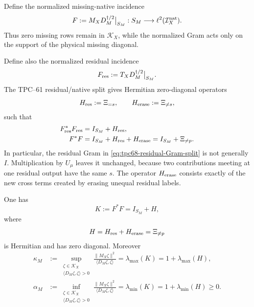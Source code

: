 Define the normalized missing-native incidence
\begin{equation}
 F:=M_XD_M^{\dagger/2}\big|_{S_M}:
 S_M\longrightarrow
 \ell^2(\mathcal I_X^{\rm nat}).
 \label{eq:tpc68-normalized-F}
\end{equation}
Thus zero missing rows remain in \(\mathcal K_X\), while the normalized
Gram acts only on the support of the physical missing diagonal.

Define also the normalized residual incidence
\begin{equation}
 F_{\rm res}:=T_XD_M^{\dagger/2}\big|_{S_M}.
 \label{eq:tpc68-normalized-residual}
\end{equation}
The TPC--61 residual/native split gives Hermitian zero-diagonal operators
\begin{equation}
 H_{\rm res}:=\Xi_{=s},
 \qquad
 H_{\rm erase}:=\Xi_{\ne s},
 \label{eq:tpc68-res-erase-defects}
\end{equation}
such that
\begin{align}
 F_{\rm res}^*F_{\rm res}
 &=I_{S_M}+H_{\rm res},
 \label{eq:tpc68-residual-Gram-split}\\
 F^*F
 &=I_{S_M}+H_{\rm res}+H_{\rm erase}
 =I_{S_M}+\Xi_{\ne p}.
 \label{eq:tpc68-native-Gram-split}
\end{align}
In particular, the residual Gram in
\eqref{eq:tpc68-residual-Gram-split} is not generally \(I\).
Multiplication by \(U_\mu\) leaves it unchanged, because two contributions
meeting at one residual output have the same \(s\).  The operator
\(H_{\rm erase}\) consists exactly of the new cross terms created by
erasing unequal residual labels.

\begin{proposition}
\label{prop:tpc68-normalized-signed-Gram}
One has
\begin{equation}
 K:=F^*F=I_{S_M}+H,
 \label{eq:tpc68-K-IH}
\end{equation}
where
\begin{equation}
 H=H_{\rm res}+H_{\rm erase}=\Xi_{\ne p}
 \label{eq:tpc68-full-H-split}
\end{equation}
is Hermitian and has zero diagonal.  Moreover
\begin{align}
 \kappa_M
 &:=\sup_{\substack{\zeta\in\mathcal K_X\\
                    \langle D_M\zeta,\zeta\rangle>0}}
   \frac{\|M_X\zeta\|^2}{\langle D_M\zeta,\zeta\rangle}
   =\lambda_{\max}(K)
   =1+\lambda_{\max}(H),
 \label{eq:tpc68-upper-native-eigenvalue}\\
 \alpha_M
 &:=\inf_{\substack{\zeta\in\mathcal K_X\\
                    \langle D_M\zeta,\zeta\rangle>0}}
   \frac{\|M_X\zeta\|^2}{\langle D_M\zeta,\zeta\rangle}
   =\lambda_{\min}(K)
   =1+\lambda_{\min}(H)\ge0.
 \label{eq:tpc68-lower-native-eigenvalue}
\end{align}
\end{proposition}

